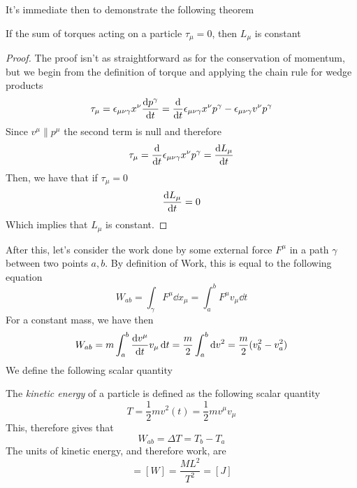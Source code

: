 \documentclass[../admech.tex]{subfiles}
\begin{document}
It's immediate then to demonstrate the following theorem
\begin{thm}
	If the sum of torques acting on a particle $\tau_\mu=0$, then $L_\mu$ is constant
\end{thm}
\begin{proof}
	The proof isn't as straightforward as for the conservation of momentum, but we begin from the definition of torque and applying the chain rule for wedge products
	\begin{equation*}
		\tau_\mu=\epsilon_{\mu\nu\gamma}x^\nu\derivative{p^\gamma}{t}=\derivative{t}\epsilon_{\mu\nu\gamma}x^\nu p^\gamma-\epsilon_{\mu\nu\gamma}v^\nu p^\gamma
	\end{equation*}
	Since $v^\mu\parallel p^\mu$ the second term is null and therefore
	\begin{equation*}
		\tau_{\mu}=\derivative{t}\epsilon_{\mu\nu\gamma}x^\nu p^\gamma=\derivative{L_\mu}{t}
	\end{equation*}
	Then, we have that if $\tau_\mu=0$
	\begin{equation*}
		\derivative{L_\mu}{t}=0
	\end{equation*}
	Which implies that $L_\mu$ is constant.
\end{proof}
After this, let's consider the work done by some external force $F^\mu$ in a path $\gamma$ between two points $a,b$. By definition of Work, this is equal to the following equation
\begin{equation}
	W_{ab}=\int_{\gamma}^{}F^\mu\dd{x_\mu}=\int_{a}^{b}F^\mu v_\mu\dd{t}
	\label{eq:workab}
\end{equation}
For a constant mass, we have then
\begin{equation}
	W_{ab}=m\int_{a}^{b}\derivative{v^\mu}{t}v_\mu\dd{t}=\frac{m}{2}\int_{a}^{b}\dd{v^2}=\frac{m}{2}(v^2_b-v^2_a)
	\label{eq:workabcomp}
\end{equation}
We define the following scalar quantity
\begin{dfn}
	The \emph{kinetic energy} of a particle is defined as the following scalar quantity
	\begin{equation}
		T=\frac{1}{2}mv^2(t)=\frac{1}{2}mv^\mu v_\mu
		\label{eq:kinen}
	\end{equation}
	This, therefore gives that
	\begin{equation}
		W_{ab}=\Delta T=T_b-T_a
		\label{eq:workkinen}
	\end{equation}
	The units of kinetic energy, and therefore work, are
	\begin{equation*}
		[T]=[W]=\frac{ML^2}{T^2}=[J]
	\end{equation*}
\end{dfn}
\end{document}
